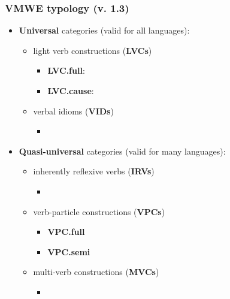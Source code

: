 \documentclass[xcolor=dvipsnames]{beamer}
\begin{document}
\begin{frame}
  \vspace*{-5pt}
  \frametitle{VMWE typology (v. 1.3)}

\begin{scriptsize}
\begin{block}{}
\begin{itemize}
\item \textbf{Universal} categories (valid for all languages):
   \begin{itemize}
   \item light verb constructions (\textbf{LVCs})
	\begin{itemize}
	\item \textbf{LVC.full}:  
	\item \textbf{LVC.cause}:  
	\end{itemize}
   \item verbal idioms (\textbf{VIDs})
	\begin{itemize}
	\item[]  
	\end{itemize}
   \end{itemize}
\item \textbf{Quasi-universal} categories (valid for many languages):
   \begin{itemize}
   \item inherently reflexive verbs (\textbf{IRVs})
	\begin{itemize}
	\item[]  
	\end{itemize}
   \item verb-particle constructions (\textbf{VPCs})
	\begin{itemize}
	\item \textbf{VPC.full}  
	\item \textbf{VPC.semi}  
	\end{itemize}
   \item multi-verb constructions (\textbf{MVCs})
	\begin{itemize}
	\item[]  
	\end{itemize}
   \end{itemize}

\end{itemize}
\end{block}
\end{scriptsize}
\end{frame}
\end{document}
